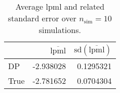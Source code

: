 \begin{table}[H]

\caption{Average lpml and related standard error over $n_{\text{sim}} = 10$ simulations.}
\centering
\begin{tabular}[t]{lrr}
\toprule
  & $\overbar{\text{lpml}}$ & $\text{sd}(\overbar{\text{lpml}})$\\
\midrule
DP & -2.938028 & 0.1295321\\
True & -2.781652 & 0.0704304\\
\bottomrule
\end{tabular}
\end{table}